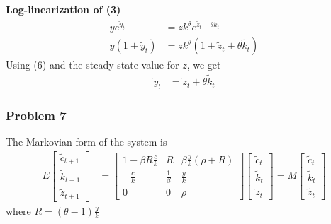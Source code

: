 \documentclass[11pt]{article}
\begin{document}
    \textbf{Log-linearization of (3)} \begin{align*}
    ye^{\tilde{y}_t} &= z k^\theta e^{ \tilde{z}_t + \theta \tilde{k}_t } \\
    y(1 + \tilde{y}_t) &= z k^\theta (1 + \tilde{z}_t + \theta \tilde{k}_t )
\end{align*} Using (6) and the steady state value for \(z\), we get
\begin{align*}
     \tilde{y}_t &= \tilde{z}_t +  \theta\tilde{k}_t
\end{align*}

    \hypertarget{problem-7}{%
\subsubsection{Problem 7}\label{problem-7}}

The Markovian form of the system is \begin{align*}
    E
    \begin{bmatrix}
    \tilde{c}_{t+1} \\
    \tilde{k}_{t+1} \\
    \tilde{z}_{t+1}
    \end{bmatrix}
    &=
    \begin{bmatrix}
    1 - \beta R \frac{c}{k} & R & \beta \frac{y}{k}(\rho +  R) \\
    -\frac{c}{k} & \frac{1}{\beta} & \frac{y}{k} \\
    0 & 0 & \rho
    \end{bmatrix}
    \begin{bmatrix}
    \tilde{c}_{t} \\
    \tilde{k}_{t} \\
    \tilde{z}_{t}
    \end{bmatrix} 
    =
    M
    \begin{bmatrix}
    \tilde{c}_{t} \\
    \tilde{k}_{t} \\
    \tilde{z}_{t}
    \end{bmatrix}  
\end{align*} where \(R = (\theta - 1) \frac{y}{k}\)
\end{document}

